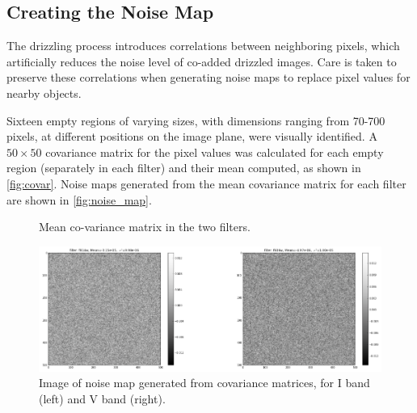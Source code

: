 \documentclass[a4paper,11pt]{article}
\begin{document}
\subsection{Creating the Noise Map}
\label{sec:noise_map}
The drizzling process introduces correlations between neighboring pixels, which artificially reduces the noise level of co-added drizzled images. Care is taken to preserve these correlations when generating noise maps to replace pixel values for nearby objects. 
 
Sixteen empty regions of varying sizes, with dimensions ranging from 70-700 pixels,  at different positions on the image plane, were visually identified. A $50\times50$ covariance matrix for the pixel values was calculated for each empty region (separately in each filter) and their mean computed, as shown in \autoref{fig:covar}.
Noise maps generated from the mean covariance matrix for each filter are shown in \autoref{fig:noise_map}.

\begin{figure}[h]
  \centering
  \hfill
  \caption{Mean co-variance matrix in the two filters.}
  \label{fig:covar}
\end{figure}

\begin{figure}[h]
\centering\includegraphics[width=1.\linewidth]{noise_map.png}
\caption{Image of noise map generated from covariance matrices, for I band (left) and V band (right).}
\label{fig:noise_map}
\end{figure}
\end{document}
